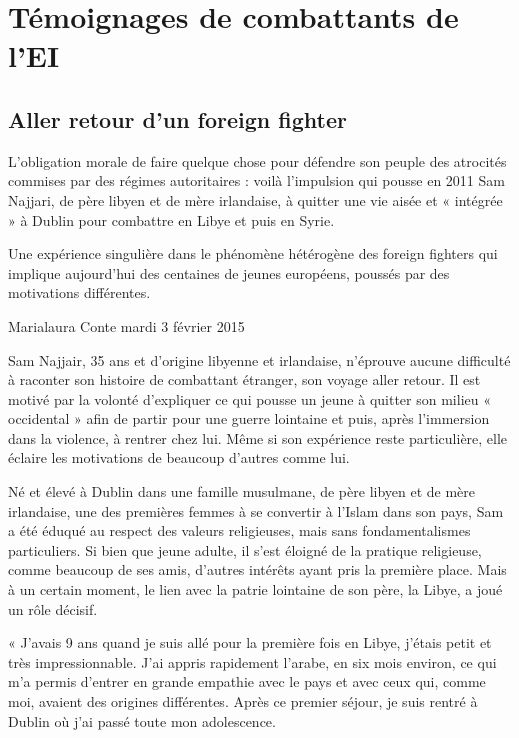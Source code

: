 \hypertarget{tuxe9moignages-de-combattants-de-lei}{%
\section{Témoignages de combattants de
l'EI}\label{tuxe9moignages-de-combattants-de-lei}}
\hypertarget{aller-retour-dun-foreign-fighter}{%
\subsection{Aller retour d'un foreign
fighter}\label{aller-retour-dun-foreign-fighter}}

L'obligation morale de faire quelque chose pour défendre son peuple des
atrocités commises par des régimes autoritaires : voilà l'impulsion qui
pousse en 2011 Sam Najjari, de père libyen et de mère irlandaise, à
quitter une vie aisée et « intégrée » à Dublin pour combattre en Libye
et puis en Syrie.

Une expérience singulière dans le phénomène hétérogène des foreign
fighters qui implique aujourd'hui des centaines de jeunes européens,
poussés par des motivations différentes.

Marialaura Conte \textbar{} mardi 3 février 2015

Sam Najjair, 35 ans et d'origine libyenne et irlandaise, n'éprouve
aucune difficulté à raconter son histoire de combattant étranger, son
voyage aller retour. Il est motivé par la volonté d'expliquer ce qui
pousse un jeune à quitter son milieu « occidental » afin de partir pour
une guerre lointaine et puis, après l'immersion dans la violence, à
rentrer chez lui. Même si son expérience reste particulière, elle
éclaire les motivations de beaucoup d'autres comme lui.

Né et élevé à Dublin dans une famille musulmane, de père libyen et de
mère irlandaise, une des premières femmes à se convertir à l'Islam dans
son pays, Sam a été éduqué au respect des valeurs religieuses, mais sans
fondamentalismes particuliers. Si bien que jeune adulte, il s'est
éloigné de la pratique religieuse, comme beaucoup de ses amis, d'autres
intérêts ayant pris la première place. Mais à un certain moment, le lien
avec la patrie lointaine de son père, la Libye, a joué un rôle décisif.

« J'avais 9 ans quand je suis allé pour la première fois en Libye,
j'étais petit et très impressionnable. J'ai appris rapidement l'arabe,
en six mois environ, ce qui m'a permis d'entrer en grande empathie avec
le pays et avec ceux qui, comme moi, avaient des origines différentes.
Après ce premier séjour, je suis rentré à Dublin où j'ai passé toute mon
adolescence.

